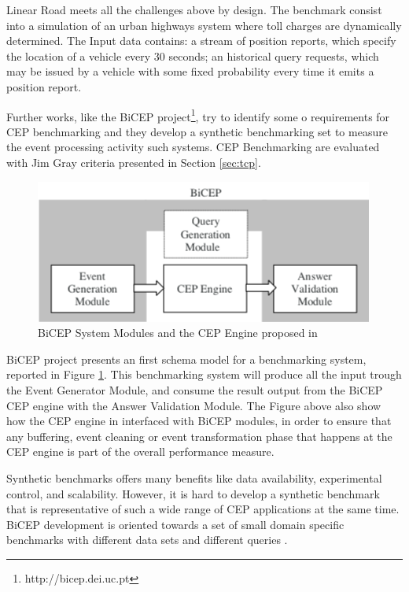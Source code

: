 Linear Road meets all the challenges above by design. The benchmark consist into a simulation of an urban highways system where toll charges are dynamically determined. The Input data contains: a stream of position reports, which specify the location of a vehicle every 30 seconds; an historical query requests, which may be issued by a vehicle with some fixed probability every time it emits a position report.

Further works, like the BiCEP project\footnote{http://bicep.dei.uc.pt}, try to identify some o requirements for CEP benchmarking and they develop a synthetic benchmarking set to measure the event processing activity such systems. CEP Benchmarking are evaluated with Jim Gray criteria presented in Section \ref{sec:tcp}. 

\begin{figure}[tbh]
  \centering
	\includegraphics[width=\linewidth]{images/bicep_schema}
	\caption{BiCEP System Modules and the CEP Engine proposed in \cite{bizarro:DSP:2007:1143}} 
  	\label{fig:bicep-schema}
\end{figure}

BiCEP project presents an first schema model for a benchmarking system, reported in Figure \ref{fig:bicep-schema}. This benchmarking system will produce all the input trough the Event Generator Module, and consume the result output from the BiCEP CEP engine with the Answer Validation Module. The Figure above also show how the CEP engine in interfaced with BiCEP modules, in order to ensure that any buffering, event cleaning or event transformation phase that happens at the CEP engine is part of the overall performance measure. 

Synthetic benchmarks offers many benefits like data availability, experimental control, and scalability. However, it is hard to develop a synthetic benchmark that is representative of such a wide range of CEP applications at the same time. BiCEP development is oriented towards a set of small domain specific benchmarks with different data sets and different queries \cite{bizarro:DSP:2007:1143}.


